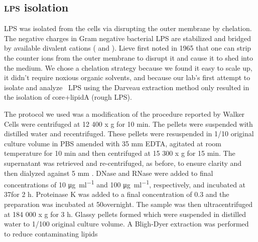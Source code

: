 	\subsection{\textsc{lps} isolation} %
	\label{sub:LPS_isolation}
  \ac{LPS} was isolated from the cells via disrupting the outer membrane by chelation.  The negative charges in Gram negative bacterial \ac{LPS} are stabilized and bridged by available
  divalent cations (\ie{}  and ). Lieve first noted in 1965 that
  one can strip the counter ions from the outer membrane to disrupt it and cause it to shed into the
  medium. We chose a chelation strategy because we found it easy to scale up, it didn't require
  noxious organic solvents, and because our lab's first attempt to isolate and analyze \caulobacter\
  \ac{LPS} using the Darveau extraction method only
  resulted in the isolation of core+lipidA (rough \ac{LPS}).

  The protocol we used was a modification of the procedure reported by Walker
  \etal\!\upcite{walker94} Cells were centrifuged at 12 400 x g for 10 min. The pellets were
  suspended with distilled water and recentrifuged. These pellets were resuspended in 1/10 original
  culture volume in \ac{PBS}\upcite{maniatis} amended with 35 \si{\milli\meter} \ac{EDTA}, agitated
  at room temperature for 10 min and then centrifuged at 15 300 x g for 15 min. The supernatant was
  retrieved and re-centrifuged, as before, to ensure clarity and then dialyzed against 5
  \si{\milli\meter} \ce{MgCl2}. DNase and RNase were added to final concentrations of 10
  \si{\micro\gram\per\milli\litre} and 100 \si{\micro\gram\per\milli\litre}\!, respectively, and
  incubated at 37\cel for 2 h. Proteinase K was added to a final concentration of 0.3 \mgperml and
  the preparation was incubated at 50\cel overnight. The sample was then ultracentrifuged at 184 000
  x g for 3 h. Glassy pellets formed which were suspended in distilled water to 1/100 original
  culture volume. A Bligh-Dyer extraction was performed to reduce contaminating
  lipids\upcite[.]{blighdyer}

